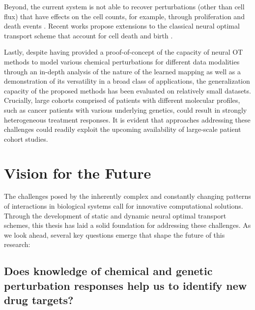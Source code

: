 Beyond, the current system is not able to recover perturbations (other than cell flux) that have effects on the cell counts, for example, through proliferation and death events \citep{tritschler2019concepts}. Recent works propose extensions to the classical neural optimal transport scheme that account for cell death and birth \citep{lubeck2022neural, pariset2023unbalanced, chen2022most, baradat2021regularized}.

 Lastly, despite having provided a proof-of-concept of the capacity of neural OT methods to model various chemical perturbations for different data modalities through an in-depth analysis of the nature of the learned mapping as well as a demonstration of its versatility in a broad class of applications, the generalization capacity of the proposed methods has been evaluated on relatively small datasets.
Crucially, large cohorts comprised of patients with different molecular profiles, such as cancer patients with various underlying genetics, could result in strongly heterogeneous treatment responses.
It is evident that approaches addressing these challenges could readily exploit the upcoming availability of large-scale patient cohort studies.

\section*{Vision for the Future}

The challenges posed by the inherently complex and constantly changing patterns of interactions in biological systems call for innovative computational solutions. Through the development of static and dynamic neural optimal transport schemes, this thesis has laid a solid foundation for addressing these challenges.
As we look ahead, several key questions emerge that shape the future of this research:

\subsection*{\textbf{Does knowledge of chemical and genetic perturbation responses help us to identify new drug targets?}}

